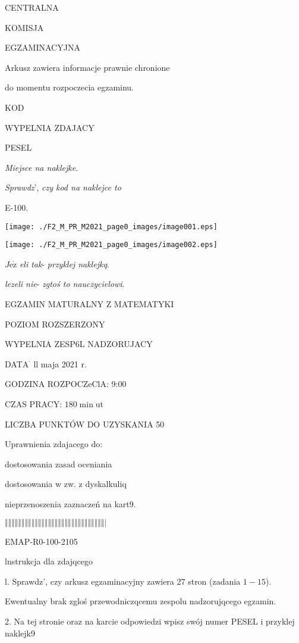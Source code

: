 \documentclass[a4paper,12pt]{article}
\begin{document}
CENTRALNA

KOMISJA

EGZAMINACYJNA

Arkusz zawiera informacje prawnie chronione

do momentu rozpoczecia egzaminu.

KOD

WYPELNIA ZDAJACY

PESEL

{\it Miejsce na naklejke}.

{\it Sprawdz}', {\it czy kod na naklejce to}

E-100.
\begin{center}
\texttt{[image: ./F2\_M\_PR\_M2021\_page0\_images/image001.eps]}

\texttt{[image: ./F2\_M\_PR\_M2021\_page0\_images/image002.eps]}
\end{center}
$J\mathrm{e}\dot{\mathrm{z}}$ {\it eli tak}- {\it przyklej naklejkq}.

{\it lezeli nie}- {\it zgtoś to nauczycielowi}.

EGZAMIN MATURALNY Z MATEMATYKI

POZIOM ROZSZERZONY

WYPELNIA ZESP6L NADZORUJACY

DAT$\mathrm{A}^{\cdot}$ ll maja 2021 $\mathrm{r}.$

GODZINA ROZPOCZeClA: 9:00

CZAS PRACY: $180 \displaystyle \min \mathrm{u}\mathrm{t}$

LICZBA PUNKTÓW DO UZYSKANIA 50

Uprawnienia zdajacego do:

\fbox{} dostosowania zasad oceniania

\fbox{} dostosowania w zw. z dyskalkuliq

\fbox{} nieprzenoszenia zaznaczeń na kart9.

$\Vert\Vert\Vert\Vert\Vert\Vert\Vert\Vert\Vert\Vert\Vert\Vert\Vert\Vert\Vert\Vert\Vert\Vert\Vert\Vert\Vert\Vert\Vert\Vert\Vert\Vert\Vert\Vert\Vert\Vert|$

EMAP-R0-100-2105

lnstrukcja dla zdajqcego

l. Sprawdz', czy arkusz egzaminacyjny zawiera 27 stron (zadania $1-15$).

Ewentualny brak zgloś przewodniczqcemu zespolu nadzorujqcego egzamin.

2. Na tej stronie oraz na karcie odpowiedzi wpisz swój numer PESEL i przyklej naklejk9
\end{document}
